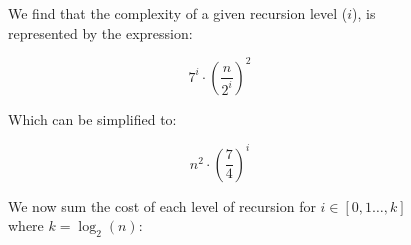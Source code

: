 \documentclass{article}
\begin{document}
            \begin{figure}[!ht]
                \centering
                \begin{minipage}{0.9\textwidth}
                    We find that the complexity of a given recursion level ($i$), is represented by the expression:
                    
                    \begin{equation}                        
                        7^{i} \cdot \left(\frac{n}{2^{i}}\right)^{2}
                    \end{equation}
                    
                    Which can be simplified to:
                    
                    \begin{equation}
                        n^{2} \cdot \left(\frac{7}{4}\right)^{i}
                    \end{equation}

                    We now sum the cost of each level of recursion for $i \in [0,1\dots,k]$ where $k = \log_{2}(n)$:


\end{minipage}
\end{figure}
\end{document}
